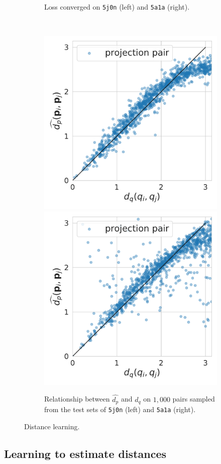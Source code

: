 \begin{figure}
\begin{minipage}[b]{0.45\linewidth}
\begin{subfigure}[b]{\linewidth}
            \caption{Loss converged on \texttt{5j0n} (left) and \texttt{5a1a} (right).\vspace{0.8em}}\label{fig:distance-learning:loss}
        \end{subfigure}
        \\ %
        \begin{subfigure}[b]{\linewidth}
            \centering
            \includegraphics[width=0.40\linewidth]{figures/dPdQ_5j0n.pdf}
            \hspace{0.5cm}
            \includegraphics[width=0.40\linewidth]{figures/dPdQ_5a1a.pdf}
            \caption{Relationship between $\widehat{d_p}$ and $d_q$ on $1,000$ pairs sampled from the test sets of \texttt{5j0n} (left) and \texttt{5a1a} (right).}\label{fig:distance-learning:dpdq}
        \end{subfigure}
        \caption{Distance learning.
        }
    \end{minipage}
\end{figure}


\subsection{Learning to estimate distances}\label{sec:results:distance-estimation:learned}

